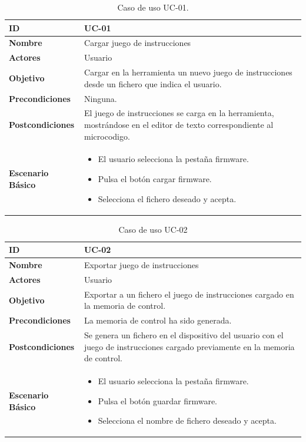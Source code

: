 \begin{center}
\begin{table}[htbp]
\centering
\caption{Caso de uso UC-01.}
\begin{tabular}{@{}p{2.5cm} p{9cm}@{}} 
\toprule
\textbf{ID}	& UC-01  \\
\midrule
\textbf{Nombre} 		& Cargar juego de instrucciones   \\
\midrule
\textbf{Actores} 		&	Usuario  \\
\midrule
\textbf{Objetivo} 	&	Cargar en la herramienta un nuevo juego de instrucciones desde un fichero que indica el usuario. 	 \\
\midrule
\textbf{Precondiciones}	&	Ninguna.   \\
\midrule
\textbf{Postcondiciones} 	&	El juego de instrucciones se carga en la herramienta, mostrándose en el editor de texto correspondiente al \gls{microcodigo}.   \\
\midrule
\textbf{Escenario Básico} 	&  \begin{itemize}
\item El usuario selecciona la pestaña firmware.
\item Pulsa el botón cargar firmware.
\item Selecciona el fichero deseado y acepta.
\end{itemize} \\
\bottomrule
\end{tabular}
\label{tab:uc01}
\end{table}
\end{center}


\begin{center}
\begin{table}[htbp]
\centering
\caption{Caso de uso UC-02}
\begin{tabular}{@{}p{2.5cm} p{9cm}@{}} 
\toprule
\textbf{ID}	& UC-02  \\
\midrule
\textbf{Nombre} 		& Exportar juego de instrucciones   \\
\midrule
\textbf{Actores} 		&	Usuario  \\
\midrule
\textbf{Objetivo} 	&	Exportar a un fichero el juego de instrucciones cargado en la memoria de control. 	 \\
\midrule
\textbf{Precondiciones}	&	La memoria de control ha sido generada.   \\
\midrule
\textbf{Postcondiciones} 	& Se genera un fichero en el dispositivo del usuario con el juego de instrucciones cargado previamente en la memoria de control.   \\
\midrule
\textbf{Escenario Básico} 	&  \begin{itemize}
\item El usuario selecciona la pestaña firmware.
\item Pulsa el botón guardar firmware.
\item Selecciona el nombre de fichero deseado y acepta.
\end{itemize} \\
\bottomrule
\end{tabular}
\label{tab:uc02}
\end{table}
\end{center}


